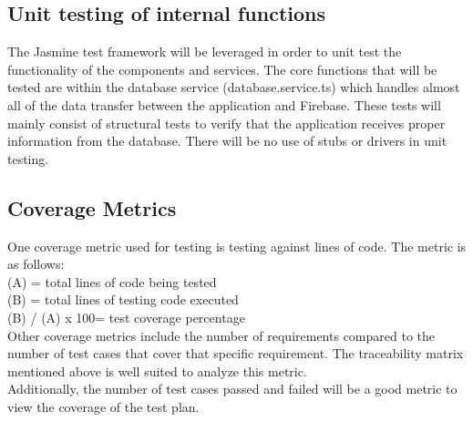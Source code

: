 \documentclass[12pt,fleqn]{article}
\begin{document}
\subsection{Unit testing of internal functions}
The Jasmine test framework will be leveraged in order to unit test the functionality of the components and services. The core functions that will be tested are within the database service (database.service.ts) which handles almost all of the data transfer between the application and Firebase. These tests will mainly consist of structural tests to verify that the application receives proper information from the database. There will be no use of stubs or drivers in unit testing.

\subsection{Coverage Metrics}
One coverage metric used for testing is testing against lines of code. The metric is as follows: \\
(A) = total lines of code being tested \\
(B) = total lines of testing code executed \\
(B) / (A)  x 100= test coverage percentage\\

Other coverage metrics include the number of requirements compared to the number of test cases that cover that specific requirement.  The traceability matrix mentioned above is well suited to analyze this metric.  \\

Additionally, the number of test cases passed and failed will be a good metric to view the coverage of the test plan.  
\end{document}
